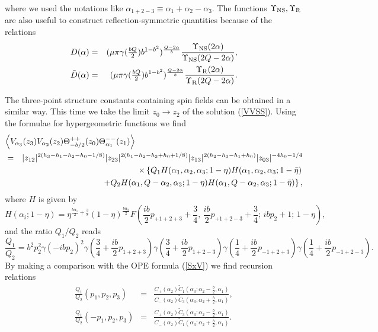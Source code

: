 \documentclass[a4paper,12pt]{article}
\newcommand{\vev}[1]{\left<{#1}\right>}
\newcommand{\tfrac}[2]{{\textstyle\frac{#1}{#2}}}
\newcommand{\Up}{{\Upsilon}}
\newcommand{\NS}{{\rm NS}}
\newcommand{\R}{{\rm R}}
\begin{document}
 where we used the notations like
 $\alpha_{1+2-3}\equiv \alpha_1+\alpha_2-\alpha_3$.
 The functions $\Up_\NS,\Up_\R$ are also useful to construct
 reflection-symmetric quantities because of the relations
\begin{eqnarray}
  D(\alpha) &=& (\mu\pi\gamma(\tfrac{bQ}{2})b^{1-b^2})^{\frac{Q-2\alpha}{b}}
                \frac{\Up_\NS(2\alpha)}{\Up_\NS(2Q-2\alpha)},
 \nonumber \\
  \tilde{D}(\alpha) &=&
  (\mu\pi\gamma(\tfrac{bQ}{2})b^{1-b^2})^{\frac{Q-2\alpha}{b}}
  \frac{\Up_\R(2\alpha)}{\Up_\R(2Q-2\alpha)}.
\end{eqnarray}

   The three-point structure constants containing spin fields
 can be obtained in a similar way.
 This time we take the limit $z_0\rightarrow z_2$ of 
 the solution (\ref{VVSS}).
 Using the formulae for hypergeometric functions we find
\begin{eqnarray}
\lefteqn{
  \vev{V_{\alpha_3}(z_3)V_{\alpha_2}(z_2)
       \Theta_{-b/2}^{++}(z_0)\Theta_{\alpha_1}^{--}(z_1)} } \nonumber \\
 &=& |z_{12}|^{2(h_3-h_1-h_2-h_0-1/8)}
   |z_{23}|^{2(h_1-h_2-h_3+h_0+1/8)}
   |z_{13}|^{2(h_2-h_3-h_1+h_0)}
   |z_{03}|^{-4h_0-1/4}
 \nonumber \\ && \hskip-5mm\times
   \left\{Q_1H(\alpha_1,\alpha_2,\alpha_3;1-\eta)
             H(\alpha_1,\alpha_2,\alpha_3;1-\bar{\eta})
   \right. \nonumber \\ && ~~~ \left.
         +Q_2H(\alpha_1,Q-\alpha_2,\alpha_3;1-\eta)
             H(\alpha_1,Q-\alpha_2,\alpha_3;1-\bar{\eta})
   \right\},
\end{eqnarray}
 where $H$ is given by
\begin{equation}
 H(\alpha_i;1-\eta) =
 \eta^{\frac{b\alpha_1}{2}+\frac{3}{8}}
 (1-\eta)^{\frac{b\alpha_2}{2}}
 F(\tfrac{ib}{2}p_{+1+2+3}+\tfrac{3}{4},\,
   \tfrac{ib}{2}p_{+1+2-3}+\tfrac{3}{4};\,
   ibp_2+1;\,1-\eta),
\end{equation}
 and the ratio $Q_1/Q_2$ reads
\begin{equation}
  \frac{Q_1}{Q_2} =
 b^2p_2^2\gamma(-ibp_2)^2
  \gamma(\tfrac{3}{4}+\tfrac{ib}{2}p_{1+2+3})
  \gamma(\tfrac{3}{4}+\tfrac{ib}{2}p_{1+2-3})
  \gamma(\tfrac{1}{4}+\tfrac{ib}{2}p_{-1+2+3})
  \gamma(\tfrac{1}{4}+\tfrac{ib}{2}p_{-1+2-3}).
\end{equation}
 By making a comparison with the OPE formula (\ref{SxV}) we find
 recursion relations
\begin{eqnarray}
  \frac{Q_1}{Q_2}(p_1,p_2,p_3) &=&
  \frac{C_+(\alpha_2)\tilde{C}_1(\alpha_3;\alpha_2-\frac{b}{2},\alpha_1)}
       {C_-(\alpha_2)\tilde{C}_3(\alpha_3;\alpha_2+\frac{b}{2},\alpha_1)},
 \nonumber \\
  \frac{Q_1}{Q_2}(-p_1,p_2,p_3) &=&
  \frac{C_+(\alpha_2)\tilde{C}_3(\alpha_3;\alpha_2-\frac{b}{2},\alpha_1)}
       {C_-(\alpha_2)\tilde{C}_1(\alpha_3;\alpha_2+\frac{b}{2},\alpha_1)}.
\end{eqnarray}
\end{document}

